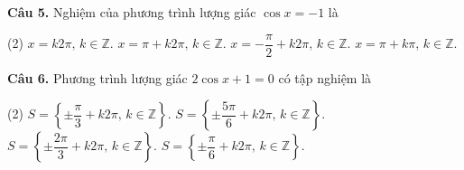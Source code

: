 \documentclass[12pt, a4paper]{article}
\newcommand{\cau}[1]{\vspace{0.12cm}\noindent\textbf{Câu #1. }}
\begin{document}
\cau{5} Nghiệm của phương trình lượng giác $\cos x = -1$ là
\begin{tasks}(2)
\task $x = k2\pi,\, k\in\mathbb{Z}$.
\task $x = \pi + k2\pi,\, k\in\mathbb{Z}$.
\task $x = -\dfrac{\pi}{2} + k2\pi,\, k\in\mathbb{Z}$.
\task $x = \pi + k\pi,\, k\in\mathbb{Z}$.
\end{tasks}

\cau{6} Phương trình lượng giác $2\cos x + 1 = 0$ có tập nghiệm là
\begin{tasks}(2)
\task $S = \left\{\pm\dfrac{\pi}{3} + k2\pi,\, k\in\mathbb{Z}\right\}$.
\task $S = \left\{\pm\dfrac{5\pi}{6} + k2\pi,\, k\in\mathbb{Z}\right\}$.
\task $S = \left\{\pm\dfrac{2\pi}{3} + k2\pi,\, k\in\mathbb{Z}\right\}$.
\task $S = \left\{\pm\dfrac{\pi}{6} + k2\pi,\, k\in\mathbb{Z}\right\}$.
\end{tasks}
\end{document}

